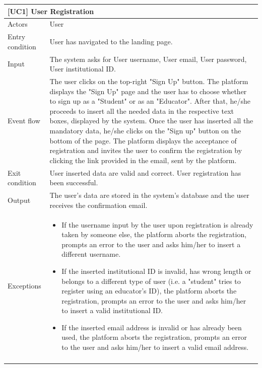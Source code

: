 \documentclass[12pt,oneside,a4paper]{article}
\begin{document}
\begin{table}[htbp]
\begin{tabular}{|l|p{12cm}|}
    \hline
    \multicolumn{2}{|l|}{\textbf{[UC1] User Registration}}\\
    \hline
    Actors & User\\
    \hline
    Entry condition & User has navigated to the landing page.\\
    \hline
    Input & The system asks for User username, User email, User password, User institutional ID.
    \\
    \hline
    Event flow & The user clicks on the top-right "Sign Up" button. The platform displays the "Sign Up" page and the user has to choose whether to sign up as a "Student" or as an "Educator". After that, he/she proceeds to insert all the needed data in the respective text boxes, displayed by the system. Once the user has inserted all the mandatory data, he/she clicks on the "Sign up" button on the bottom of the page. The platform displays the acceptance of registration and invites the user to confirm the registration by clicking the link provided in the email, sent by the platform.\\
    \hline
    Exit condition & User inserted data are valid and correct. User registration has been successful.\\
    \hline
    Output & The user's data are stored in the system's database and the user receives the confirmation email.
    \\
    \hline
    Exceptions & \begin{itemize}
        \item If the username input by the user upon registration is already taken by someone else, the platform aborts the registration, prompts an error to the user and asks him/her to insert a different username.
        \item If the inserted institutional ID is invalid, has wrong length or belongs to a different type of user (i.e. a "student" tries to register using an educator's ID), the platform aborts the registration, prompts an error to the user and asks him/her to insert a valid institutional ID.
        \item If the inserted email address is invalid or has already been used, the platform aborts the registration, prompts an error to the user and asks him/her to insert a valid email address.
    \end{itemize}\\
    \lasthline
\end{tabular}
\end{table}
\clearpage
\end{document}
